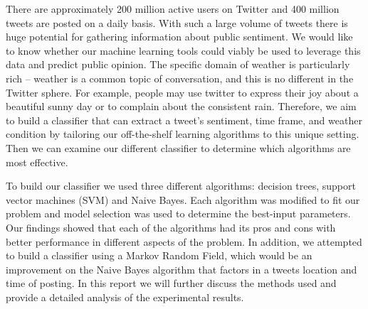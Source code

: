 	There are approximately 200 million active users on Twitter and 400 million tweets are posted on a daily basis. With such a large volume of tweets there is huge potential for gathering information about public sentiment. We would like to know whether our machine learning tools could viably be used to leverage this data and predict public opinion. The specific domain of weather is particularly rich – weather is a common topic of conversation, and this is no different in the Twitter sphere. For example, people may use twitter to express their joy about a beautiful sunny day or to complain about the consistent rain. Therefore, we aim to build a classifier that can extract a tweet's sentiment, time frame, and weather condition by tailoring our off-the-shelf learning algorithms to this unique setting. Then we can examine our different classifier to determine which algorithms are most effective.

            To build our classifier we used three different algorithms: decision trees, support vector machines (SVM) and Naive Bayes. Each algorithm was modified to fit our problem and model selection was used to determine the best-input parameters. Our findings showed that each of the algorithms had its pros and cons with better performance in different aspects of the problem. In addition, we attempted to build a classifier using a Markov Random Field, which would be an improvement on the Naive Bayes algorithm that factors in a tweets location and time of posting. In this report we will further discuss the methods used and provide a detailed analysis of the experimental results.  